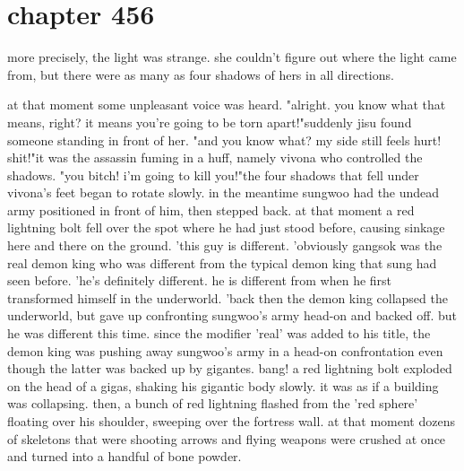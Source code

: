 \section{chapter 456}

more precisely, the light was strange.
 she couldn't figure out where the light came from, but there were as many as four shadows of hers in all directions.





at that moment some unpleasant voice was heard.
"alright.
 you know what that means, right? it means you're going to be torn apart!"suddenly jisu found someone standing in front of her.
"and you know what? my side still feels hurt! shit!"it was the assassin fuming in a huff, namely vivona who controlled the shadows.
"you bitch! i'm going to kill you!"the four shadows that fell under vivona's feet began to rotate slowly.
in the meantime sungwoo had the undead army positioned in front of him, then stepped back.
at that moment a red lightning bolt fell over the spot where he had just stood before, causing sinkage here and there on the ground.
'this guy is different.
'obviously gangsok was the real demon king who was different from the typical demon king that sung had seen before.
 'he's definitely different.
 he is different from when he first transformed himself in the underworld.
'back then the demon king collapsed the underworld, but gave up confronting sungwoo's army head-on and backed off.
 but he was different this time.
 since the modifier 'real' was added to his title, the demon king was pushing away sungwoo's army in a head-on confrontation even though the latter was backed up by gigantes.
bang! a red lightning bolt exploded on the head of a gigas, shaking his gigantic body slowly.
 it was as if a building was collapsing.
then, a bunch of red lightning flashed from the 'red sphere' floating over his shoulder, sweeping over the fortress wall.
 at that moment dozens of skeletons that were shooting arrows and flying weapons were crushed at once and turned into a handful of bone powder.

